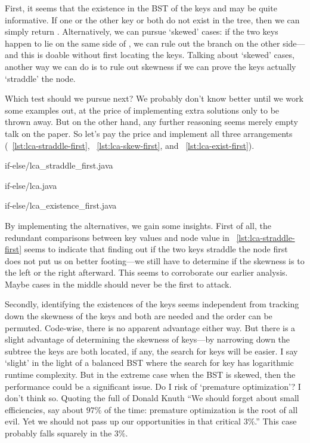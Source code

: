 First, it seems that the existence in the BST of the keys  and  may be
quite informative.
If one or the other key or both do not exist in the tree, then we can simply return .
Alternatively, we can pursue `skewed' cases: if the two keys happen to lie on the same side of
, we can rule out the branch on the other side---and this is doable
without first locating the keys.
Talking about `skewed' cases, another way we can do is to rule out skewness if we can prove the keys
actually `straddle' the  node.


Which test should we pursue next?
We probably don't know better until we work some examples out, at the price of implementing extra
solutions only to be thrown away.
But on the other hand, any further reasoning seems merely empty talk on the paper.
So let's pay the price and implement all three arrangements (~\autoref{lst:lca-straddle-first},
~\ref{lst:lca-skew-first}, and ~\ref{lst:lca-exist-first}).
\begin{clisting}
    
    {if-else/lca_straddle_first.java}
    
    {if-else/lca.java}
    
    {if-else/lca_existence_first.java}
\end{clisting}

By implementing the alternatives, we gain some insights.
First of all, the redundant comparisons between key values and  node value in
~\autoref{lst:lca-straddle-first} seems to indicate that
finding out if the two keys straddle the  node first does not put us
on better footing---we still have to determine if the skewness is to the left or the right
afterward.
This seems to corroborate our earlier analysis.
Maybe cases in the middle should never be the first to attack.

Secondly, identifying the existences of the keys seems independent from tracking down the
skewness of the keys and both are needed and the order can be permuted.
Code-wise, there is no apparent advantage either way.
But there is a slight advantage of determining the skewness of keys---by narrowing down the
subtree the keys are both located, if any, the search for keys will be easier.
I say `slight' in the light of a balanced BST where the search for key has logarithmic runtime
complexity.
But in the extreme case when the BST is skewed, then the performance could be a significant issue.
Do I risk of `premature optimization'?
I don't think so.
Quoting the full of Donald Knuth ``We should forget about small efficiencies,
say about $97\%$ of the time: premature optimization is the root of all evil.
Yet we should not pass up our opportunities in that critical $3\%$.''
This case probably falls squarely in the $3\%$.

